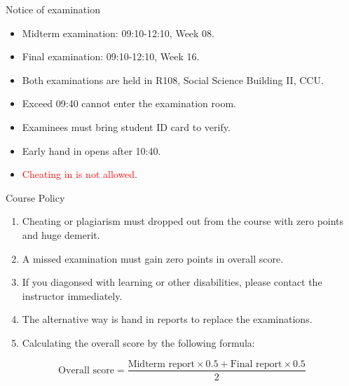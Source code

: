 \documentclass{beamer}
\begin{document}
\begin{frame}{Notice of examination}
\begin{itemize}
    \pause
    \item Midterm examination: 09:10-12:10, Week 08.
    \pause
    \item Final examination: 09:10-12:10, Week 16.
    \pause
    \item Both examinations are held in R108, Social Science Building II, CCU.
    \pause
    \item Exceed 09:40 cannot enter the examination room.
    \pause
    \item Examinees must bring student ID card to verify.
    \pause
    \item Early hand in opens after 10:40.
    \pause
    \item \textcolor{red}{Cheating in is not allowed}.
\end{itemize}
\end{frame}
\begin{frame}{Course Policy}
\begin{enumerate}
\pause
\item Cheating or plagiarism must dropped out from the course with zero points and huge demerit. \\
\pause
\item A missed examination must gain zero points in overall score. \\
\pause
\item If you diagonsed with learning or other disabilities, please contact the instructor immediately. \\
\pause
\item The alternative way is hand in reports to replace the examinations. \\
\pause
\item Calculating the overall score by the following formula: \\
\end{enumerate}
\begin{equation*}
\text{Overall score} = \frac{\text{Midterm report} \times 0.5 + \text{Final report} \times 0.5}{2}
\end{equation*}
\end{frame}
\end{document}
